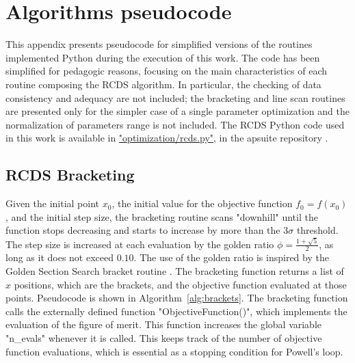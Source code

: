 \chapter{Algorithms pseudocode}
\label{chap:pseudocode}
This appendix presents pseudocode for simplified versions of the routines implemented Python during the execution of this work. The code has been simplified for pedagogic reasons, focusing on the main characteristics of each routine composing the RCDS algorithm. In particular, the checking of data consistency and adequacy are not included; the bracketing and line scan routines are presented only for the simpler case of a single parameter optimization and the normalization of parameters range is not included. The RCDS Python code used in this work is available in \href{https://github.com/lnls-fac/apsuite/blob/master/apsuite/optimization/rcds.py}{"optimization/rcds.py"}, in the apsuite  repository \cite{apsuite}.

\section{RCDS Bracketing}
Given the initial point $x_0$, the initial value for the objective function $f_0 = f(x_0)$, and the initial step size, the bracketing routine scans "downhill" until the function stops decreasing and starts to increase by more than the $3\sigma$ threshold. The step size is increased at each evaluation by the golden ratio $\phi=\frac{1+\sqrt{5}}{2}$, as long as it does not exceed $0.10$. The use of the golden ratio is inspired by the Golden Section Search bracket routine \cite[sec. 10.2]{press_numerical_2007}. The bracketing function returns a list of $x$ positions, which are the brackets, and the objective function evaluated at those points. Pseudocode is shown in Algorithm~\ref{alg:brackets}. The bracketing function calls the externally defined function "ObjectiveFunction()", which implements the evaluation of the figure of merit. This function increases the global variable "n\_evals" whenever it is called. This keeps track of the number of objective function evaluations, which is essential as a stopping condition for Powell's loop.

